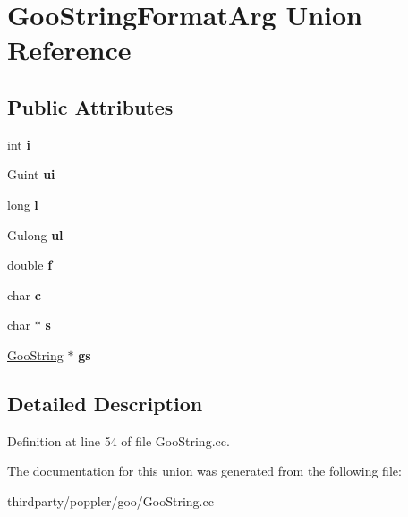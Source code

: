 \hypertarget{union_goo_string_format_arg}{}\section{Goo\+String\+Format\+Arg Union Reference}
\label{union_goo_string_format_arg}
\subsection*{Public Attributes}
\begin{DoxyCompactItemize}
\item 
\mbox{\label{union_goo_string_format_arg_ac3a171da78d6d9e8d340cb523bb9c73c}} 
int {\bfseries i}
\item 
\mbox{\label{union_goo_string_format_arg_aeb4f3a5bcacc5f30a8f690e532d7b945}} 
Guint {\bfseries ui}
\item 
\mbox{\label{union_goo_string_format_arg_aba0b113760092f1ce7dd672d236e6e79}} 
long {\bfseries l}
\item 
\mbox{\label{union_goo_string_format_arg_acc9c4214f3a4814febb2bd1a11ceb96b}} 
Gulong {\bfseries ul}
\item 
\mbox{\label{union_goo_string_format_arg_a7d01ddefa33914e9ef87749e7031634f}} 
double {\bfseries f}
\item 
\mbox{\label{union_goo_string_format_arg_a81d7d292ad237afa4daa5900adb17283}} 
char {\bfseries c}
\item 
\mbox{\label{union_goo_string_format_arg_a2b6e16450fc90e3c1913380fbca92df8}} 
char $\ast$ {\bfseries s}
\item 
\mbox{\label{union_goo_string_format_arg_ae8e2889efc6dfbbd819404fc8cf91367}} 
\hyperlink{class_goo_string}{Goo\+String} $\ast$ {\bfseries gs}
\end{DoxyCompactItemize}


\subsection{Detailed Description}


Definition at line 54 of file Goo\+String.\+cc.



The documentation for this union was generated from the following file\+:\begin{DoxyCompactItemize}
\item 
thirdparty/poppler/goo/Goo\+String.\+cc\end{DoxyCompactItemize}
